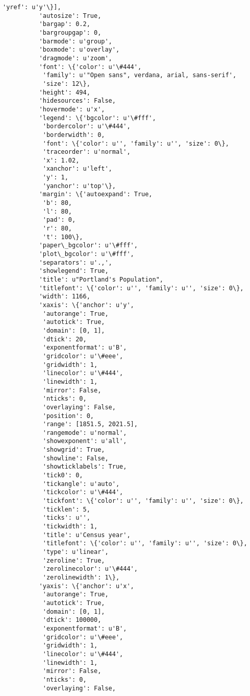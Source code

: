 \documentclass{article}
\begin{document}
\begin{Verbatim}[commandchars=\\\{\}]
            'yref': u'y'\}],
          'autosize': True,
          'bargap': 0.2,
          'bargroupgap': 0,
          'barmode': u'group',
          'boxmode': u'overlay',
          'dragmode': u'zoom',
          'font': \{'color': u'\#444',
           'family': u'"Open sans", verdana, arial, sans-serif',
           'size': 12\},
          'height': 494,
          'hidesources': False,
          'hovermode': u'x',
          'legend': \{'bgcolor': u'\#fff',
           'bordercolor': u'\#444',
           'borderwidth': 0,
           'font': \{'color': u'', 'family': u'', 'size': 0\},
           'traceorder': u'normal',
           'x': 1.02,
           'xanchor': u'left',
           'y': 1,
           'yanchor': u'top'\},
          'margin': \{'autoexpand': True,
           'b': 80,
           'l': 80,
           'pad': 0,
           'r': 80,
           't': 100\},
          'paper\_bgcolor': u'\#fff',
          'plot\_bgcolor': u'\#fff',
          'separators': u'.,',
          'showlegend': True,
          'title': u"Portland's Population",
          'titlefont': \{'color': u'', 'family': u'', 'size': 0\},
          'width': 1166,
          'xaxis': \{'anchor': u'y',
           'autorange': True,
           'autotick': True,
           'domain': [0, 1],
           'dtick': 20,
           'exponentformat': u'B',
           'gridcolor': u'\#eee',
           'gridwidth': 1,
           'linecolor': u'\#444',
           'linewidth': 1,
           'mirror': False,
           'nticks': 0,
           'overlaying': False,
           'position': 0,
           'range': [1851.5, 2021.5],
           'rangemode': u'normal',
           'showexponent': u'all',
           'showgrid': True,
           'showline': False,
           'showticklabels': True,
           'tick0': 0,
           'tickangle': u'auto',
           'tickcolor': u'\#444',
           'tickfont': \{'color': u'', 'family': u'', 'size': 0\},
           'ticklen': 5,
           'ticks': u'',
           'tickwidth': 1,
           'title': u'Census year',
           'titlefont': \{'color': u'', 'family': u'', 'size': 0\},
           'type': u'linear',
           'zeroline': True,
           'zerolinecolor': u'\#444',
           'zerolinewidth': 1\},
          'yaxis': \{'anchor': u'x',
           'autorange': True,
           'autotick': True,
           'domain': [0, 1],
           'dtick': 100000,
           'exponentformat': u'B',
           'gridcolor': u'\#eee',
           'gridwidth': 1,
           'linecolor': u'\#444',
           'linewidth': 1,
           'mirror': False,
           'nticks': 0,
           'overlaying': False,

\end{Verbatim}
\end{document}
